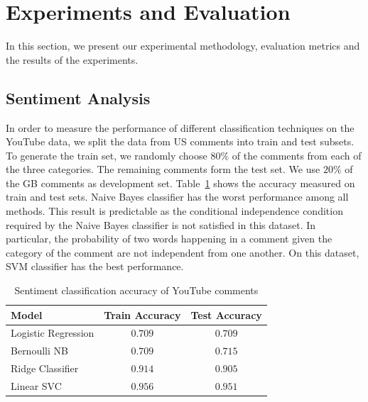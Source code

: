 \section{Experiments and Evaluation}
\label{sec:exp}
In this section, we present our experimental methodology, evaluation metrics and the results of the experiments.

\subsection{Sentiment Analysis}
\label{sec:sent-exp}
In order to measure the performance of different classification techniques on the YouTube data, we split the data from US comments into train and test subsets. To generate the train set, we randomly choose $80\%$ of the comments from each of the three categories. The remaining comments form the test set. We use $20\%$ of the GB comments as development set. 
Table~\ref{tab:accuracy} shows the accuracy measured on train and test sets. Naive Bayes classifier has the worst performance among all methods. This result is predictable as the conditional independence condition required by the Naive Bayes classifier is not satisfied in this dataset. In particular, the probability of two words happening in a comment given the category of the comment are not independent from one another. On this dataset, SVM classifier has the best performance.

\begin{table}%
\centering
\begin{tabular}{|l|c|c|}
\hline
Model & Train Accuracy & Test Accuracy \\
\hline
Logistic Regression & $0.709$ & $0.709$ \\
\hline
Bernoulli NB & $0.709$ & $0.715$ \\
\hline
Ridge Classifier & $0.914$ & $0.905$ \\
\hline
Linear SVC & $0.956$ & $0.951$ \\
\hline
\end{tabular}
\caption{Sentiment classification accuracy of YouTube comments}
\label{tab:accuracy}
\end{table}

